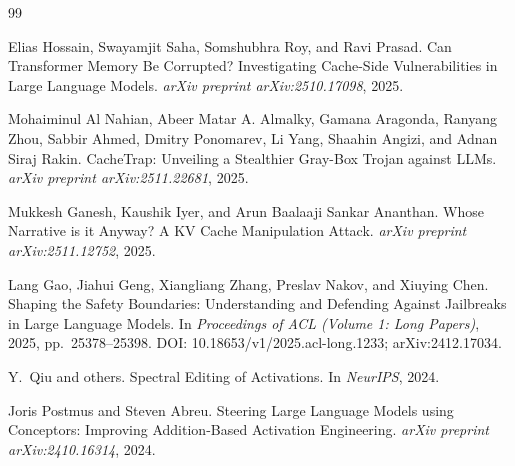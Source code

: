 \begin{thebibliography}{99}

Elias Hossain, Swayamjit Saha, Somshubhra Roy, and Ravi Prasad.
\newblock Can Transformer Memory Be Corrupted? Investigating Cache-Side Vulnerabilities in Large Language Models.
\newblock \emph{arXiv preprint arXiv:2510.17098}, 2025.

Mohaiminul Al Nahian, Abeer Matar A. Almalky, Gamana Aragonda, Ranyang Zhou, Sabbir Ahmed, Dmitry Ponomarev, Li Yang, Shaahin Angizi, and Adnan Siraj Rakin.
\newblock CacheTrap: Unveiling a Stealthier Gray-Box Trojan against LLMs.
\newblock \emph{arXiv preprint arXiv:2511.22681}, 2025.

Mukkesh Ganesh, Kaushik Iyer, and Arun Baalaaji Sankar Ananthan.
\newblock Whose Narrative is it Anyway? A KV Cache Manipulation Attack.
\newblock \emph{arXiv preprint arXiv:2511.12752}, 2025.

Lang Gao, Jiahui Geng, Xiangliang Zhang, Preslav Nakov, and Xiuying Chen.
\newblock Shaping the Safety Boundaries: Understanding and Defending Against Jailbreaks in Large Language Models.
\newblock In \emph{Proceedings of ACL (Volume 1: Long Papers)}, 2025, pp.~25378--25398. DOI: 10.18653/v1/2025.acl-long.1233; arXiv:2412.17034.

Y.~Qiu and others.
\newblock Spectral Editing of Activations.
\newblock In \emph{NeurIPS}, 2024.

Joris Postmus and Steven Abreu.
\newblock Steering Large Language Models using Conceptors: Improving Addition-Based Activation Engineering.
\newblock \emph{arXiv preprint arXiv:2410.16314}, 2024.

\end{thebibliography}
